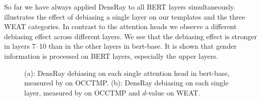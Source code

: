 So far we have always applied DensRay to all BERT layers
simultaneously.   illustrates the effect of
debiasing a single  layer on our templates and the three
WEAT categories.  In contrast to the attention heads we observe a different debiasing effect across different layers. We see that the debiasing effect is
stronger in layers 7--10 than in the other layers in
bert-base. It is shown that gender information is processed on BERT layers, especially the upper layers.
\begin{figure}[h]
	\centering
	\footnotesize
	\centering
	\caption{(a): DensRay debiasing on each single attention head in bert-base, measured by  on OCCTMP. (b): DensRay debiasing on each single layer, measured by  on  OCCTMP and $d$-value on WEAT.}
\end{figure}

